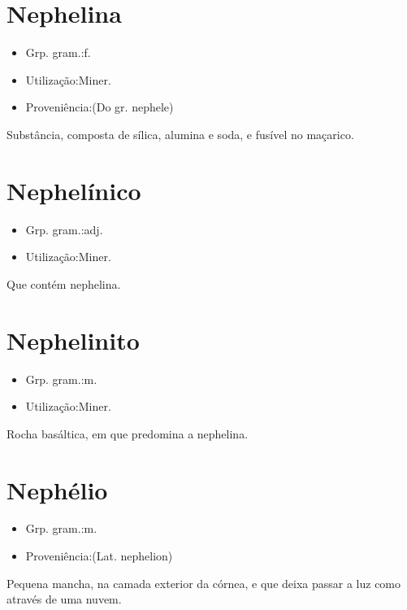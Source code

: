 \section{Nephelina}
\begin{itemize}
\item {Grp. gram.:f.}
\end{itemize}
\begin{itemize}
\item {Utilização:Miner.}
\end{itemize}
\begin{itemize}
\item {Proveniência:(Do gr. \textunderscore nephele\textunderscore )}
\end{itemize}
Substância, composta de sílica, alumina e soda, e fusível no maçarico.
\section{Nephelínico}
\begin{itemize}
\item {Grp. gram.:adj.}
\end{itemize}
\begin{itemize}
\item {Utilização:Miner.}
\end{itemize}
Que contém nephelina.
\section{Nephelinito}
\begin{itemize}
\item {Grp. gram.:m.}
\end{itemize}
\begin{itemize}
\item {Utilização:Miner.}
\end{itemize}
Rocha basáltica, em que predomina a nephelina.
\section{Nephélio}
\begin{itemize}
\item {Grp. gram.:m.}
\end{itemize}
\begin{itemize}
\item {Proveniência:(Lat. \textunderscore nephelion\textunderscore )}
\end{itemize}
Pequena mancha, na camada exterior da córnea, e que deixa passar a luz como através de uma nuvem.
